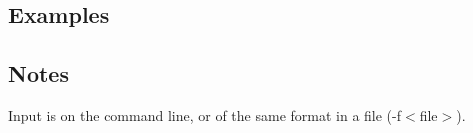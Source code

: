 \subsection{Examples}

\subsection{Notes}
Input is on the command line, or of the same format in a file (-f$<$file$>$).

%

